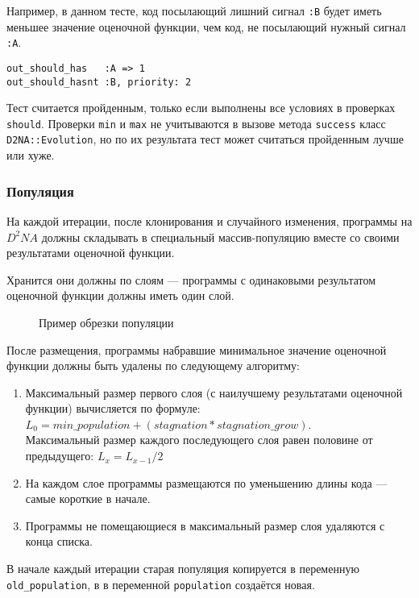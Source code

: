\documentclass[utf8,a5paper,portrait,10pt]{eskdtext}
\begin{document}
Например, в данном тесте, код посылающий лишний сигнал \texttt{:B} будет иметь
меньшее значение оценочной функции, чем код, не посылающий нужный сигнал
\texttt{:A}.

\begin{verbatim}
out_should_has   :A => 1
out_should_hasnt :B, priority: 2
\end{verbatim}

Тест считается пройденным, только если выполнены все условиях в проверках
\texttt{should}. Проверки \texttt{min} и \texttt{max} не учитываются в вызове
метода \texttt{success} класс \texttt{D2NA::Evolution}, но по их результата
тест может считаться пройденным лучше или хуже.

\subsubsection{Популяция}

На каждой итерации, после клонирования и случайного изменения, программы на
$D^2NA$ должны складывать в специальный массив-популяцию вместе со своими
результатами оценочной функции.

Хранится они должны по слоям — программы с одинаковыми результатом оценочной
функции должны иметь один слой.


\begin{figure}
  \centering
  
  \caption{Пример обрезки популяции}
\end{figure}

После размещения, программы набравшие минимальное значение оценочной функции
должны быть удалены по следующему алгоритму:

\begin{enumerate}
  \item Максимальный размер первого слоя (с наилучшему результатами оценочной
        функции) вычисляется по формуле:\\
        $L_0 = min\_population + (stagnation * stagnation\_grow)$.\\
        Максимальный размер каждого последующего слоя равен половине от
        предыдущего: $L_{x} = L_{x-1} / 2$
  \item На каждом слое программы размещаются по уменьшению длины кода — самые
        короткие в начале.
  \item Программы не помещающиеся в максимальный размер слоя удаляются с конца
        списка.
\end{enumerate}

В начале каждый итерации старая популяция копируется в переменную
\texttt{old\_population}, в в переменной \texttt{population} создаётся новая.
\end{document}
